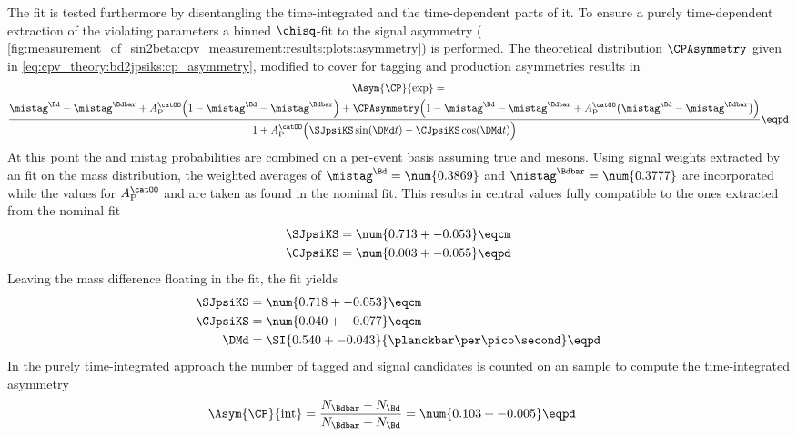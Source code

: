 The fit is tested furthermore by disentangling the time-integrated and the
time-dependent parts of it. To ensure a purely time-dependent extraction of the
\CP violating parameters a binned $\chisq$-fit to the signal \CP asymmetry (\cf
\cref{fig:measurement_of_sin2beta:cpv_measurement:results:plots:asymmetry}) is
performed. The theoretical distribution $\CPAsymmetry$ given in
\cref{eq:cpv_theory:bd2jpsiks:cp_asymmetry}, modified to cover for tagging
and production asymmetries results in
%
\begin{multline}
  \Asym{\CP}{\text{exp}} = \\
    \frac{\mistag^{\Bd} - \mistag^{\Bdbar} + A_{\text{P}}^{\catOO} \Bigl(1 - \mistag^{\Bd} - \mistag^{\Bdbar}\Bigr) + \CPAsymmetry \Bigl(1 - \mistag^{\Bd} - \mistag^{\Bdbar} + A_{\text{P}}^{\catOO} \bigl(\mistag^{\Bd} - \mistag^{\Bdbar}\bigr) \Bigr)}
    {1 + A_{\text{P}}^{\catOO} \Bigl(\SJpsiKS \sin (\DMd t) - \CJpsiKS \cos (\DMd t)\Bigr) } \eqpd
\end{multline}
%
At this point the \OS and \SSpi mistag probabilities are combined on a per-event
basis assuming true \Bd and \Bdbar mesons. Using signal weights extracted by an
\sPlot fit on the mass distribution, the weighted averages of $\mistag^{\Bd} =
\num{0.3869}$ and $\mistag^{\Bdbar} = \num{0.3777}$ are incorporated while the
values for $A_{\text{P}}^{\catOO}$ and \DMd are taken as found in the nominal
fit. This results in central values fully compatible to the ones extracted from
the nominal fit
%
\begin{equation*}
  \begin{split}
    \SJpsiKS &= \num{0.713 +- 0.053} \eqcm \\
    \CJpsiKS &= \num{0.003 +- 0.055} \eqpd
  \end{split}
\end{equation*}
%
Leaving the mass difference \DMd floating in the fit, the fit yields
%
\begin{equation*}
  \begin{split}
    \SJpsiKS &= \num{0.718 +- 0.053} \eqcm \\
    \CJpsiKS &= \num{0.040 +- 0.077} \eqcm \\
    \DMd     &= \SI{0.540 +- 0.043}{\planckbar\per\pico\second} \eqpd
  \end{split}
\end{equation*}
%
In the purely time-integrated approach the number of tagged \Bd and \Bdbar
signal candidates is counted on an \sweighted sample to compute the
time-integrated \CP asymmetry
%
\begin{equation}\label{eq:measurement_of_sin2beta:systematics:cross_checks:time_integrated:cp_asym}
  \begin{split}
    \Asym{\CP}{\text{int}} &= \frac{N_{\Bdbar} - N_{\Bd}}{N_{\Bdbar} + N_{\Bd}} = \num{0.103 +- 0.005} \eqpd
  \end{split}
\end{equation}
